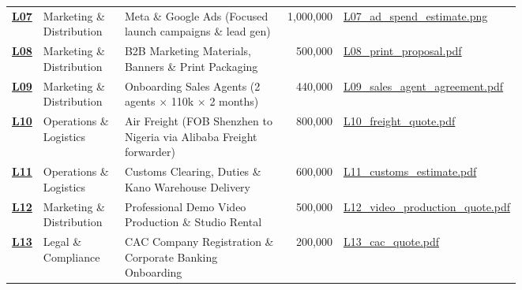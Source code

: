 \documentclass[11pt,a4paper]{article}
\begin{document}
{\begin{longtable}{p{0.05\linewidth} p{0.16\linewidth} p{0.32\linewidth} r p{0.22\linewidth}}
    \href{https://drive.google.com/drive/folders/safebox_window1_evidence/L07_ad_spend_estimate.png}{\textbf{L07}} & Marketing \& Distribution & Meta \& Google Ads (Focused launch campaigns \& lead gen) & 1,000,000 & \href{https://drive.google.com/drive/folders/safebox_window1_evidence/L07_ad_spend_estimate.png}{L07\_ad\_spend\_estimate.png} \\
    \href{https://drive.google.com/drive/folders/safebox_window1_evidence/L08_print_proposal.pdf}{\textbf{L08}} & Marketing \& Distribution & B2B Marketing Materials, Banners \& Print Packaging & 500,000 & \href{https://drive.google.com/drive/folders/safebox_window1_evidence/L08_print_proposal.pdf}{L08\_print\_proposal.pdf} \\
    \href{https://drive.google.com/drive/folders/safebox_window1_evidence/L09_sales_agent_agreement.pdf}{\textbf{L09}} & Marketing \& Distribution & Onboarding Sales Agents (2 agents $\times$ \text{₦}110k $\times$ 2 months) & 440,000 & \href{https://drive.google.com/drive/folders/safebox_window1_evidence/L09_sales_agent_agreement.pdf}{L09\_sales\_agent\_agreement.pdf} \\
    \href{https://drive.google.com/drive/folders/safebox_window1_evidence/L10_freight_quote.pdf}{\textbf{L10}} & Operations \& Logistics & Air Freight (FOB Shenzhen to Nigeria via Alibaba Freight forwarder) & 800,000 & \href{https://drive.google.com/drive/folders/safebox_window1_evidence/L10_freight_quote.pdf}{L10\_freight\_quote.pdf} \\
    \href{https://drive.google.com/drive/folders/safebox_window1_evidence/L11_customs_estimate.pdf}{\textbf{L11}} & Operations \& Logistics & Customs Clearing, Duties \& Kano Warehouse Delivery & 600,000 & \href{https://drive.google.com/drive/folders/safebox_window1_evidence/L11_customs_estimate.pdf}{L11\_customs\_estimate.pdf} \\
    \href{https://drive.google.com/drive/folders/safebox_window1_evidence/L12_video_production_quote.pdf}{\textbf{L12}} & Marketing \& Distribution & Professional Demo Video Production \& Studio Rental & 500,000 & \href{https://drive.google.com/drive/folders/safebox_window1_evidence/L12_video_production_quote.pdf}{L12\_video\_production\_quote.pdf} \\
    \href{https://drive.google.com/drive/folders/safebox_window1_evidence/L13_cac_quote.pdf}{\textbf{L13}} & Legal \& Compliance & CAC Company Registration \& Corporate Banking Onboarding & 200,000 & \href{https://drive.google.com/drive/folders/safebox_window1_evidence/L13_cac_quote.pdf}{L13\_cac\_quote.pdf} \\

\end{longtable}}
\end{document}
